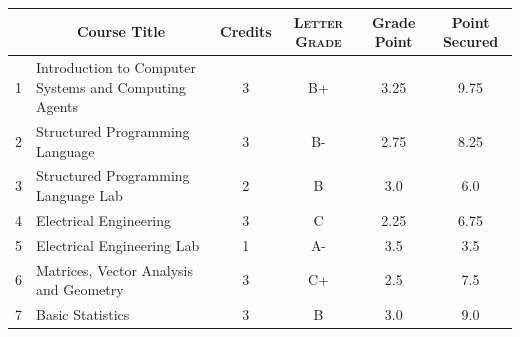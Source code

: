 \documentclass[11pt]{article}
\newcommand*{\numtwo}[1]{\pgfmathprintnumber[
                    fixed, precision=2, fixed zerofill=true]{#1}}
\begin{document}
                \begin{center}
                    \renewcommand{\arraystretch}{1.08}
                    
                \begin{tabular}{|c|l|c|>{\scshape}c|c|c|}
                \hline  \rule[-1ex]{0pt}{3.5ex} {\centering{\bf Course Code}} &  \multicolumn{1}{c|}{\textbf{Course Title}}  & {\bf Credits} & {\bf Letter Grade} & {\bf Grade Point} & {\bf Point Secured}  \\ 
                \hline   1 &  Introduction to Computer Systems and Computing Agents		 & 3 & B+ & 3.25 & 9.75 \\ %
                \hline   2 &  Structured Programming Language		 & 3 & B- & 2.75 & 8.25 \\ %
                \hline   3 &  Structured Programming Language Lab		 & 2 & B & 3.0 & 6.0 \\ %
                \hline   4 &  Electrical Engineering		 & 3 & C & 2.25 & 6.75 \\ %
                \hline   5 &  Electrical Engineering Lab		 & 1 & A- & 3.5 & 3.5 \\ %
                \hline   6 &  Matrices, Vector Analysis and Geometry		 & 3 & C+ & 2.5 & 7.5 \\ %
                \hline   7 &  Basic Statistics		 & 3 & B & 3.0 & 9.0 \\ %

\hline                %
                \end{tabular}
                \end{center}
                \renewcommand{\arraystretch}{1.03}
\end{document}

